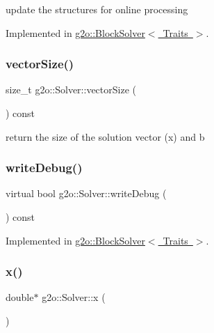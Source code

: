 update the structures for online processing 

Implemented in \mbox{\hyperlink{classg2o_1_1_block_solver_a662473598270cdf89075607f87440759}{g2o\+::\+Block\+Solver$<$ Traits $>$}}.

\mbox{\label{classg2o_1_1_solver_a7a5907ca706eef77acce4ab534857c96}} 
\subsubsection{\texorpdfstring{vector\+Size()}{vectorSize()}}
{\footnotesize\ttfamily size\+\_\+t g2o\+::\+Solver\+::vector\+Size (\begin{DoxyParamCaption}{ }\end{DoxyParamCaption}) const\hspace{0.3cm}{\ttfamily [inline]}}



return the size of the solution vector (x) and b 

\mbox{\label{classg2o_1_1_solver_a0f6f14940eccea0f9bf9e2ea144c9b4d}} 
\subsubsection{\texorpdfstring{write\+Debug()}{writeDebug()}}
{\footnotesize\ttfamily virtual bool g2o\+::\+Solver\+::write\+Debug (\begin{DoxyParamCaption}{ }\end{DoxyParamCaption}) const\hspace{0.3cm}{\ttfamily [pure virtual]}}



Implemented in \mbox{\hyperlink{classg2o_1_1_block_solver_aab81798b80dcb6c4182fa1d510914234}{g2o\+::\+Block\+Solver$<$ Traits $>$}}.

\mbox{\label{classg2o_1_1_solver_acb097d8568624a1f3af4dba808e5593b}} 
\subsubsection{\texorpdfstring{x()}{x()}\hspace{0.1cm}{\footnotesize\ttfamily [1/2]}}
{\footnotesize\ttfamily double$\ast$ g2o\+::\+Solver\+::x (\begin{DoxyParamCaption}{ }\end{DoxyParamCaption})\hspace{0.3cm}{\ttfamily [inline]}}



